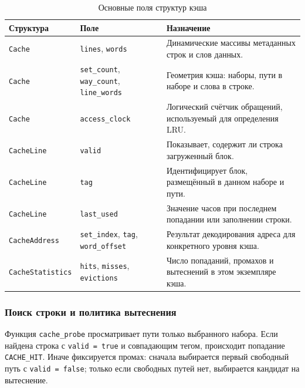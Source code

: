 \documentclass[12pt,a4paper]{article}
\begin{document}
\begin{table}[H]
    \centering
    \caption{Основные поля структур кэша}
    \label{tab:cache-fields}
    \begin{tabular}{|p{3.2cm}|p{4.2cm}|p{6.5cm}|}
        \hline
        \textbf{Структура} & \textbf{Поле} & \textbf{Назначение} \\
        \hline
        \texttt{Cache} & \texttt{lines}, \texttt{words} & Динамические массивы метаданных строк и слов данных. \\
        \hline
        \texttt{Cache} & \texttt{set\_count}, \texttt{way\_count}, \texttt{line\_words} & Геометрия кэша: наборы, пути в наборе и слова в строке. \\
        \hline
        \texttt{Cache} & \texttt{access\_clock} & Логический счётчик обращений, используемый для определения LRU. \\
        \hline
        \texttt{CacheLine} & \texttt{valid} & Показывает, содержит ли строка загруженный блок. \\
        \hline
        \texttt{CacheLine} & \texttt{tag} & Идентифицирует блок, размещённый в данном наборе и пути. \\
        \hline
        \texttt{CacheLine} & \texttt{last\_used} & Значение часов при последнем попадании или заполнении строки. \\
        \hline
        \texttt{CacheAddress} & \texttt{set\_index}, \texttt{tag}, \texttt{word\_offset} & Результат декодирования адреса для конкретного уровня кэша. \\
        \hline
        {\small\texttt{CacheStatistics}} & {\small\texttt{hits}, \texttt{misses}, \texttt{evictions}} & Число попаданий, промахов и вытеснений в этом экземпляре кэша. \\
        \hline
    \end{tabular}
\end{table}

\subsubsection{Поиск строки и политика вытеснения}

Функция \texttt{cache\_probe} просматривает пути только выбранного набора. Если найдена строка с \texttt{valid = true} и совпадающим тегом, происходит попадание \texttt{CACHE\_HIT}. Иначе фиксируется промах: сначала выбирается первый свободный путь с \texttt{valid = false}; только если свободных путей нет, выбирается кандидат на вытеснение.
\end{document}
